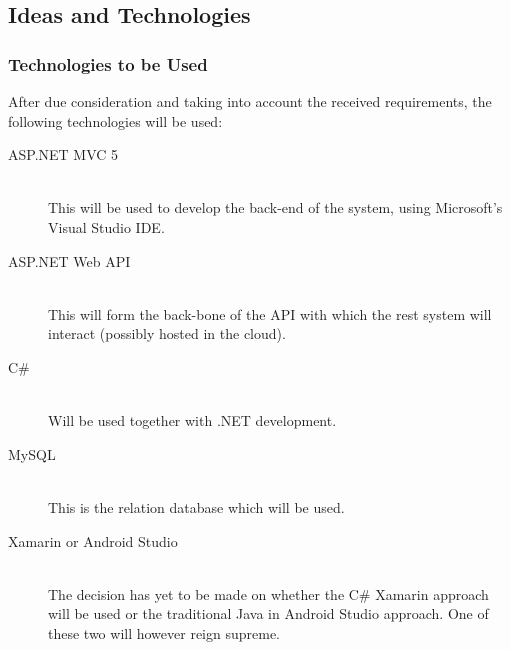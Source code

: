 \subsection{Ideas and Technologies}
\subsubsection{Technologies to be Used}
After due consideration and taking into account the received requirements, the following technologies will be used:
\begin{description}
	\item[ASP.NET MVC 5]\hfill\\
	This will be used to develop the back-end of the system, using Microsoft's Visual Studio IDE.
	\item[ASP.NET Web API]\hfill\\
	This will form the back-bone of the API with which the rest system will interact (possibly hosted in the cloud).
	\item[C\#]\hfill\\
	Will be used together with .NET development.
	\item[MySQL]\hfill\\	
	This is the relation database which will be used.
	\item[Xamarin or Android Studio]\hfill\\
	The decision has yet to be made on whether the C\# Xamarin approach will be used or the traditional Java in Android Studio approach. One of these two will however reign supreme.
	
\end{description}